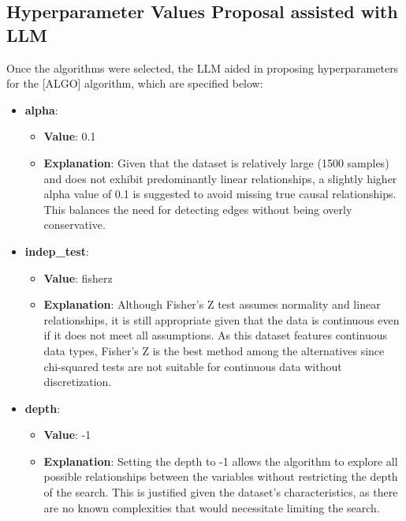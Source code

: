 \documentclass{article}
\begin{document}
        \subsection{Hyperparameter Values Proposal assisted with LLM}
        Once the algorithms were selected, the LLM aided in proposing hyperparameters 
        for the [ALGO] algorithm, which are specified below:
        
        \begin{itemize}

        
                        \item \textbf{alpha}:
                        \begin{itemize}
                            \item \textbf{Value}: 0.1
                            \item \textbf{Explanation}: Given that the dataset is relatively large (1500 samples) and does not exhibit predominantly linear relationships, a slightly higher alpha value of 0.1 is suggested to avoid missing true causal relationships. This balances the need for detecting edges without being overly conservative.
                        \end{itemize}

                         
                        \item \textbf{indep\_test}:
                        \begin{itemize}
                            \item \textbf{Value}: fisherz
                            \item \textbf{Explanation}: Although Fisher's Z test assumes normality and linear relationships, it is still appropriate given that the data is continuous even if it does not meet all assumptions. As this dataset features continuous data types, Fisher's Z is the best method among the alternatives since chi-squared tests are not suitable for continuous data without discretization.
                        \end{itemize}

                         
                        \item \textbf{depth}:
                        \begin{itemize}
                            \item \textbf{Value}: -1
                            \item \textbf{Explanation}: Setting the depth to -1 allows the algorithm to explore all possible relationships between the variables without restricting the depth of the search. This is justified given the dataset's characteristics, as there are no known complexities that would necessitate limiting the search.
                        \end{itemize}

                         
                    \end{itemize}
                    
\end{document}
